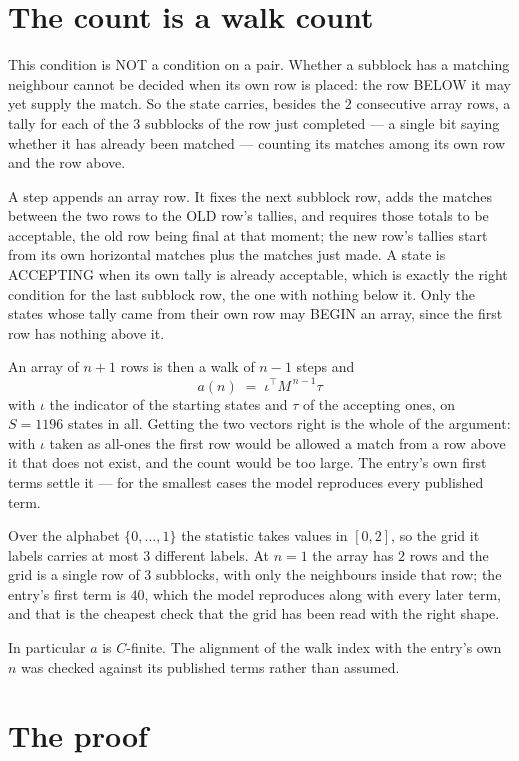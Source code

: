 \documentclass[11pt,a4paper]{article}
\theoremstyle{plain}
\theoremstyle{definition}
\begin{document}
\section{The count is a walk count}

This condition is NOT a condition on a pair. Whether a subblock has a
matching neighbour cannot be decided when its own row is placed: the row BELOW it may yet
supply the match. So the state carries, besides the $2$ consecutive array rows, a tally for
each of the $3$ subblocks of the row just completed --- a single bit saying whether it has already been matched --- counting its matches
among its own row and the row above.

A step appends an array row. It fixes the next subblock row, adds the matches between the two
rows to the OLD row's tallies, and requires those totals to be acceptable, the old row being
final at that moment; the new row's tallies start from its own horizontal matches plus the
matches just made. A state is ACCEPTING when its own tally is already acceptable, which is
exactly the right condition for the last subblock row, the one with nothing below it. Only the
states whose tally came from their own row may BEGIN an array, since the first row has nothing
above it.

An array of $n+1$ rows is then a walk of $n-1$ steps and
\[
a(n)\;=\;\iota^{\!\top}M^{\,n-1}\tau
\]
with $\iota$ the indicator of the starting states and $\tau$ of the accepting ones, on
$S=1196$ states in all. Getting the two vectors right is the whole of the argument: with
$\iota$ taken as all-ones the first row would be allowed a match from a row above it that does
not exist, and the count would be too large. The entry's own first terms settle it --- for
the smallest cases
the model reproduces every published term.

Over the alphabet $\{0,\dots,1\}$ the statistic takes values in $[0,2]$, so the
grid it labels carries at most $3$ different labels. At $n=1$ the array has $2$
rows and the grid is a single row of $3$
subblocks, with only the neighbours inside that row; the entry's first term is
$40$, which the model reproduces along with every later term, and that is the cheapest
check that the grid has been read with the right shape.

In particular $a$ is $C$-finite. The alignment of the walk index with the entry's own $n$ was
checked against its published terms rather than assumed.

\section{The proof}
\end{document}
